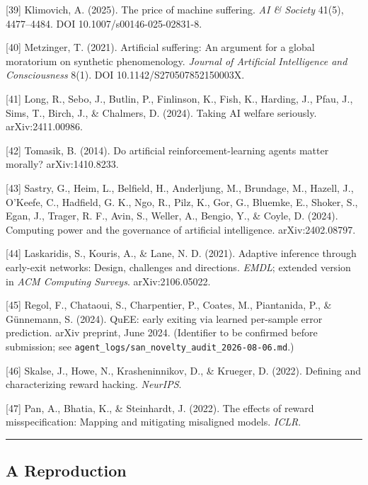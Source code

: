 \documentclass[
]{article}
\begin{document}
{[}39{]} Klimovich, A. (2025). The price of machine suffering. \emph{AI
\& Society} 41(5), 4477--4484. DOI 10.1007/s00146-025-02831-8.

{[}40{]} Metzinger, T. (2021). Artificial suffering: An argument for a
global moratorium on synthetic phenomenology. \emph{Journal of
Artificial Intelligence and Consciousness} 8(1). DOI
10.1142/S270507852150003X.

{[}41{]} Long, R., Sebo, J., Butlin, P., Finlinson, K., Fish, K.,
Harding, J., Pfau, J., Sims, T., Birch, J., \& Chalmers, D. (2024).
Taking AI welfare seriously. arXiv:2411.00986.

{[}42{]} Tomasik, B. (2014). Do artificial reinforcement-learning agents
matter morally? arXiv:1410.8233.

{[}43{]} Sastry, G., Heim, L., Belfield, H., Anderljung, M., Brundage,
M., Hazell, J., O'Keefe, C., Hadfield, G. K., Ngo, R., Pilz, K., Gor,
G., Bluemke, E., Shoker, S., Egan, J., Trager, R. F., Avin, S., Weller,
A., Bengio, Y., \& Coyle, D. (2024). Computing power and the governance
of artificial intelligence. arXiv:2402.08797.

{[}44{]} Laskaridis, S., Kouris, A., \& Lane, N. D. (2021). Adaptive
inference through early-exit networks: Design, challenges and
directions. \emph{EMDL}; extended version in \emph{ACM Computing
Surveys}. arXiv:2106.05022.

{[}45{]} Regol, F., Chataoui, S., Charpentier, P., Coates, M.,
Piantanida, P., \& Günnemann, S. (2024). QuEE: early exiting via learned
per-sample error prediction. arXiv preprint, June 2024. (Identifier to
be confirmed before submission; see
\texttt{agent\_logs/san\_novelty\_audit\_2026-08-06.md}.)

{[}46{]} Skalse, J., Howe, N., Krasheninnikov, D., \& Krueger, D.
(2022). Defining and characterizing reward hacking. \emph{NeurIPS}.

{[}47{]} Pan, A., Bhatia, K., \& Steinhardt, J. (2022). The effects of
reward misspecification: Mapping and mitigating misaligned models.
\emph{ICLR}.

\begin{center}\rule{0.5\linewidth}{0.5pt}\end{center}

\hypertarget{a-reproduction}{%
\subsection{A Reproduction}\label{a-reproduction}}
\end{document}
